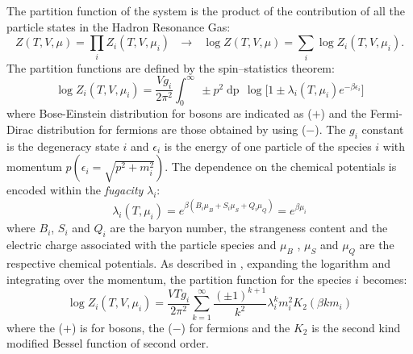 The partition function of the system is the product of the contribution of all the particle states
in the Hadron Resonance Gas:
\begin{equation} \label{eq:partfuncprod}
    Z(T,V,\mu) = \prod_{i} Z_{i}(T,V,\mu_{i}) \ \ \ \rightarrow \ \ \ 
    \log Z(T,V,\mu) = \sum_{i} \log Z_{i}(T,V,\mu_{i}).
\end{equation}
The partition functions are defined by the spin–statistics theorem:
\begin{equation} \label{eq:partfuncspin}
    \log Z_{i}(T,V,\mu_{i}) = \frac{V g_{i}}{2 \pi^{2}} \int_{0}^{\infty}\
     \pm p^{2} \mathop{dp} \, \log \Big[1\pm \lambda_{i}(T,\mu_{i})e^{- \beta \epsilon_{i}} \Big]
\end{equation}
where Bose-Einstein distribution for bosons are indicated as ($+$) and the Fermi-Dirac distribution
for fermions are those obtained by using ($-$).
The $g_{i}$ constant is the degeneracy state $i$ and $\epsilon_{i}$ is the energy of one 
particle of the species $i$ with momentum $p (\epsilon_{i} = \sqrt{p^{2} + m_{i}^{2}})$.
The dependence on the chemical potentials is encoded within the \textit{fugacity}
$\lambda_{i}$:
\begin{equation} \label{eq:fugacity}
    \lambda_{i}(T,\mu_{i}) = e^{\beta(B_{i}\mu_{B} + S_{i}\mu_{S} + Q_{i}\mu_{Q})}
    = e^{\beta \mu_{i}}
\end{equation}
where $B_{i}$, $S_{i}$ and $Q_{i}$ are the baryon number, the strangeness content and the electric
charge associated with the particle species and $\mu_{B}$ , $\mu_{S}$ and $\mu_{Q}$ are the 
respective chemical potentials. As described in \cite{pbmstat}, expanding the logarithm and
integrating over the momentum, the partition function for the species $i$ becomes:
\begin{equation}
    \log Z_{i}(T,V,\mu_{i}) = \frac{V T g_{i}}{2 \pi^{2}}
    \sum_{k=1}^{\infty} \frac{(\pm 1)^{k+1}}{k^{2}} \lambda^{k}_{i} m_{i}^{2} K_{2}(\beta k m_{i})
\end{equation}
where the ($+$) is for bosons, the ($-$) for fermions and the $K_{2}$ is the second 
kind modified Bessel function of second order.

